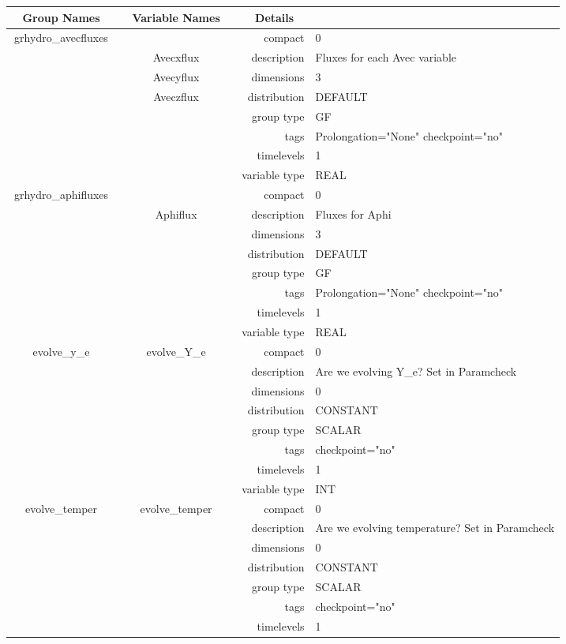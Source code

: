 \documentclass{article}
\begin{document}
\begin{tabular*}{150mm}{|c|c@{\extracolsep{\fill}}|rl|} \hline 
~ {\bf Group Names} ~ & ~ {\bf Variable Names} ~  &{\bf Details} ~ & ~ \\ 
\hline 
grhydro\_avecfluxes &  & compact & 0 \\ 
 & Avecxflux & description & Fluxes for each Avec variable \\ 
 & Avecyflux & dimensions & 3 \\ 
 & Aveczflux & distribution & DEFAULT \\ 
 &  & group type & GF \\ 
 &  & tags & Prolongation="None" checkpoint="no" \\ 
 &  & timelevels & 1 \\ 
 &  & variable type & REAL \\ 
\hline 
grhydro\_aphifluxes &  & compact & 0 \\ 
 & Aphiflux & description & Fluxes for Aphi \\ 
 &  & dimensions & 3 \\ 
 &  & distribution & DEFAULT \\ 
 &  & group type & GF \\ 
 &  & tags & Prolongation="None" checkpoint="no" \\ 
 &  & timelevels & 1 \\ 
 &  & variable type & REAL \\ 
\hline 
evolve\_y\_e & evolve\_Y\_e & compact & 0 \\ 
 &  & description & Are we evolving Y\_e? Set in Paramcheck \\ 
 &  & dimensions & 0 \\ 
 &  & distribution & CONSTANT \\ 
 &  & group type & SCALAR \\ 
 &  & tags & checkpoint="no" \\ 
 &  & timelevels & 1 \\ 
 &  & variable type & INT \\ 
\hline 
evolve\_temper & evolve\_temper & compact & 0 \\ 
 &  & description & Are we evolving temperature? Set in Paramcheck \\ 
 &  & dimensions & 0 \\ 
 &  & distribution & CONSTANT \\ 
 &  & group type & SCALAR \\ 
 &  & tags & checkpoint="no" \\ 
 &  & timelevels & 1 \\ 

\end{tabular*}
\end{document}
